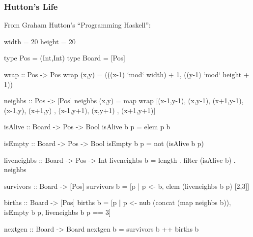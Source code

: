 \documentclass[smaller]{beamer}
\begin{document}
\begin{frame}[fragile]
\frametitle{Hutton's Life}

From Graham Hutton's ``Programming Haskell'':

\begin{codeblock}[0.65]
\tiny
\begin{semiverbatim}
width                         =  20
height                        =  20

type Pos                      = (Int,Int)
type Board                    =  [Pos]

wrap                          :: Pos -> Pos
wrap (x,y)                    =  (((x-1) `mod` width) + 1, ((y-1) `mod` height + 1))

neighbs                       :: Pos -> [Pos]
neighbs (x,y)                 =  map wrap [(x-1,y-1), (x,y-1),
                                           (x+1,y-1), (x-1,y),
                                           (x+1,y)  , (x-1,y+1),
                                           (x,y+1)  , (x+1,y+1)]

isAlive                       :: Board -> Pos -> Bool
isAlive b p                   =  elem p b

isEmpty                       :: Board -> Pos -> Bool
isEmpty b p                   =  not (isAlive b p)

liveneighbs                   :: Board -> Pos -> Int
liveneighbs b                 =  length . filter (isAlive b) . neighbs

survivors                     :: Board -> [Pos]
survivors b                   =  [p | p <- b, elem (liveneighbs b p) [2,3]]

births                        :: Board -> [Pos]
births b                      =  [p | p <- nub (concat (map neighbs b)),
                                      isEmpty b p,
                                      liveneighbs b p == 3]

nextgen                       :: Board -> Board
nextgen b                     =  survivors b ++ births b
\end{semiverbatim}
\end{codeblock}

\end{frame}
\end{document}
